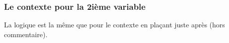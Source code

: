 \documentclass[10pt, a4paper]{article}
\begin{document}

\subsubsection{Le contexte  pour la 2ième variable}

La logique est la même que pour le contexte  en plaçant  juste après   (hors commentaire).
\end{document}
